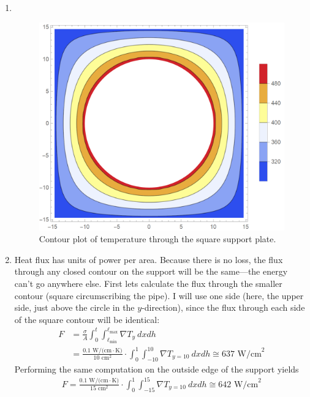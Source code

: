 \documentclass{article}
\begin{document}
\newpage

\bigskip
{}
\medskip

\begin{enumerate}[label=\alph*)]
    \item $ $ \begin{figure}[H]
        \centering
        \includegraphics[width=5in]{homework10/2a.png}
        \caption{Contour plot of temperature through the square support plate.}
        \label{fig:2a}
    \end{figure}
    \item Heat flux has units of power per area. Because there is no loss, the flux through any closed contour on the support will be the same---the energy can't go anywhere else. First lets calculate the flux through the smaller contour (square circumscribing the pipe). I will use one side (here, the upper side, just above the circle in the $y$-direction), since the flux through each side of the square contour will be identical: \begin{align*}
        F &= \frac{\sigma}{A} \int_0^t\int_{\ell_\text{min}}^{\ell_\text{max}} \nabla T_y\ dx dh\\
        &= \frac{0.1\text{ W/(cm}\cdot\text{K)}}{10\text{ cm}^2}\cdot\int_0^1 \int_{-10}^{10} \nabla T_{y=10}\  dx dh \cong 637\text{ W/cm}^2
    \end{align*}
    Performing the same computation on the outside edge of the support yields \begin{gather*}
        F = \frac{0.1\text{ W/(cm}\cdot\text{K)}}{15\text{ cm}^2}\cdot\int_0^1 \int_{-15}^{15} \nabla T_{y=10}\  dx dh \cong 642\text{ W/cm}^2

\end{gather*}
\end{enumerate}
\end{document}
